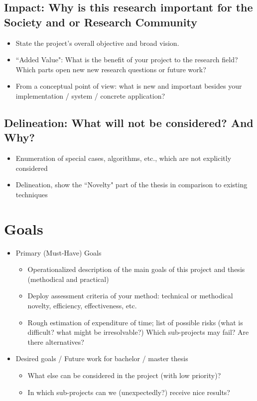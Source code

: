 \documentclass[11pt,a4paper]{article}
\begin{document}
\subsection{Impact: Why is this research important for the Society and or Research Community}

\begin{itemize}
\item State the project's overall objective and broad vision.  
\item ``Added Value": What is the benefit of your project to the research field? Which parts open new new research questions or future work?
\item From a conceptual point of view: what is new and important besides your implementation / system / concrete application?
\end{itemize}

\subsection{Delineation: What will not be considered? And Why?}

\begin{itemize}
\item Enumeration of special cases, algorithms, etc., which are not explicitly considered
\item Delineation, show the ``Novelty" part of the thesis in comparison to existing techniques 
\end{itemize}


\section{Goals}

\begin{itemize}

\item Primary (Must-Have) Goals
    \begin{itemize}
        \item Operationalized description of the main goals of this project and thesis (methodical and practical)
        \item Deploy assessment criteria of your method: technical or methodical novelty, efficiency, effectiveness, etc.
        \item Rough estimation of expenditure of time; list of possible risks (what is difficult? what might be irresolvable?) Which sub-projects may fail? Are there alternatives?
    \end{itemize}
    
\item Desired goals / Future work for bachelor / master thesis
    \begin{itemize}
        \item What else can be considered in the project (with low priority)?
        \item In which sub-projects can we (unexpectedly?) receive nice results?
    \end{itemize}
\end{itemize}
\end{document}
